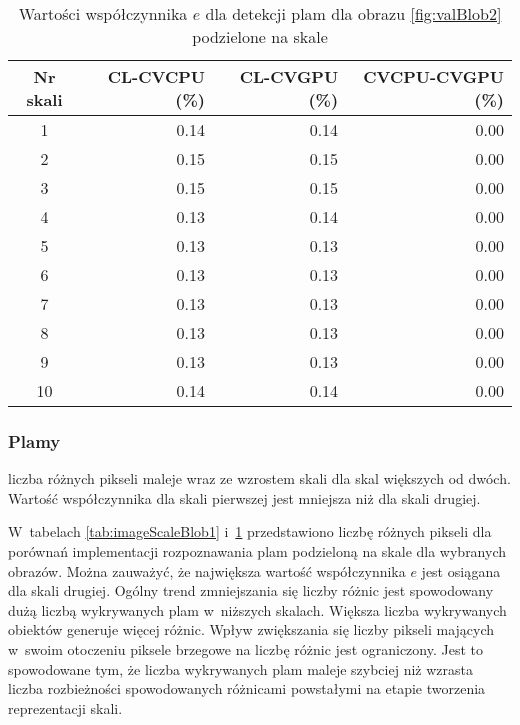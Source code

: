 \begin{center}
\begin{table}
\centering
\caption{Wartości współczynnika $ e $ dla detekcji plam dla obrazu \ref{fig:valBlob2} podzielone na skale}
\label{tab:imageScaleBlob2}
\begin{tabular}{|c|r|r|r|}
\hline
Nr skali & CL-CVCPU (\%) & CL-CVGPU (\%) & CVCPU-CVGPU (\%) \\ \hline
1        & 0.14     & 0.14     & 0.00       \\ \hline
2        & 0.15     & 0.15     & 0.00        \\ \hline
3        & 0.15     & 0.15     & 0.00       \\ \hline
4        & 0.13     & 0.14     & 0.00       \\ \hline
5        & 0.13     & 0.13     & 0.00       \\ \hline
6        & 0.13     & 0.13     & 0.00       \\ \hline
7        & 0.13     & 0.13     & 0.00       \\ \hline
8        & 0.13     & 0.13     & 0.00       \\ \hline
9        & 0.13     & 0.13     & 0.00       \\ \hline
10       & 0.14     & 0.14     & 0.00       \\ \hline
\end{tabular}
\end{table}
\end{center}

\subsubsection{Plamy}
\label{subsubsec:plamyTabele}

liczba różnych pikseli maleje wraz ze wzrostem skali dla skal większych od dwóch. Wartość współczynnika dla skali pierwszej jest mniejsza niż dla skali drugiej. 

W~tabelach \ref{tab:imageScaleBlob1} i~\ref{tab:imageScaleBlob2} przedstawiono liczbę różnych pikseli dla porównań implementacji rozpoznawania plam podzieloną na skale dla wybranych obrazów. Można zauważyć, że największa wartość współczynnika $ e $ jest osiągana dla skali drugiej. Ogólny trend zmniejszania się liczby różnic jest spowodowany dużą liczbą wykrywanych plam w~niższych skalach. Większa liczba wykrywanych obiektów generuje więcej różnic. Wpływ zwiększania się liczby pikseli mających w~swoim otoczeniu piksele brzegowe na liczbę różnic jest ograniczony. Jest to spowodowane tym, że liczba wykrywanych plam maleje szybciej niż wzrasta liczba rozbieżności spowodowanych różnicami powstałymi na etapie tworzenia reprezentacji skali.

